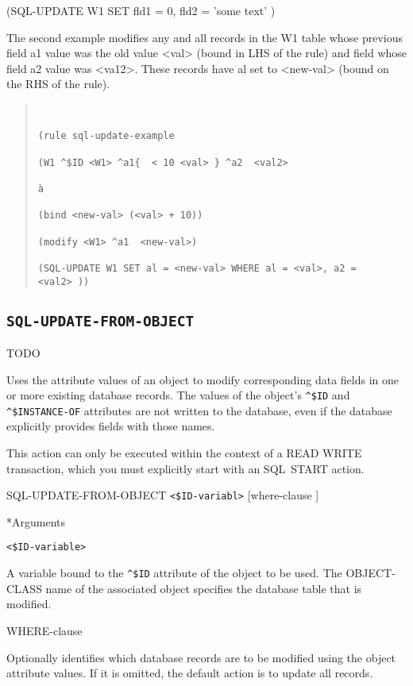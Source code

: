 {{(SQL-UPDATE W1 SET fld1 = 0, fld2 = 'some text' )



The second example modifies any and all records in the W1
table whose previous field a1 value was the old value <val>
(bound in LHS of the rule) and field whose field a2 value was
<va12>. These records have al set to <new-val> (bound on the
RHS of the rule).
\begin{quote}
\begin{verbatim}


(rule sql-update-example

(W1 ^$ID <W1> ^a1{  < 10 <val> } ^a2  <val2>

à

(bind <new-val> (<val> + 10))

(modify <W1> ^a1  <new-val>)

(SQL-UPDATE W1 SET al = <new-val> WHERE al = <val>, a2 =
<val2> ))
\end{verbatim}
\end{quote}

\subsection{\tt{SQL-UPDATE-FROM-OBJECT}}
TODO

Uses the attribute values of an object to modify corresponding data
fields in one or more existing database records. The values of the
object's \verb|^$ID| and \verb|^$INSTANCE-OF| attributes are not
written to the database, even if the database explicitly provides
fields with those names.

This action can only be executed within the context of a READ
WRITE transaction, which you must explicitly start with an
SQL~START action.

\Format

SQL-UPDATE-FROM-OBJECT \verb|<$ID-variabl>| [where-clause ]

*Arguments

\verb|<$ID-variable>|

A variable bound to the \verb|^$ID| attribute of the object to be
used. The OBJECT-CLASS name of the associated object specifies the database
table that is modified.

WHERE-clause

Optionally identifies which database records are to be
modified using the object attribute values. If it is omitted,
the default action is to update all records.

\Example

}}
